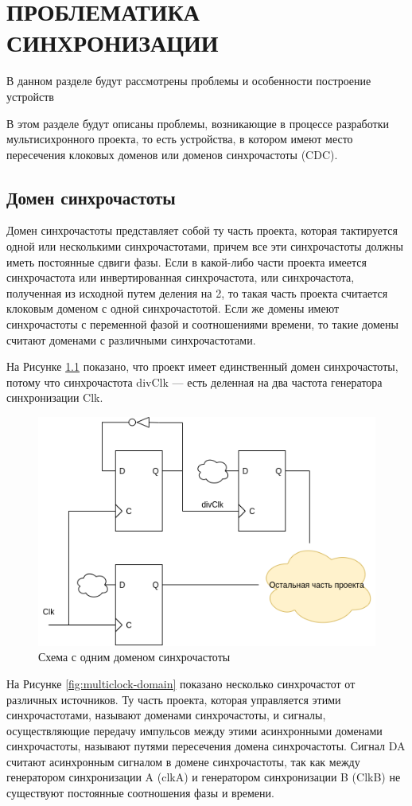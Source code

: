 \chapter{ПРОБЛЕМАТИКА СИНХРОНИЗАЦИИ}

В данном разделе будут рассмотрены проблемы и особенности построение устройств


В этом разделе будут описаны проблемы, возникающие в процессе разработки мультисихронного проекта, то есть устройства, в котором имеют место пересечения клоковых доменов или доменов синхрочастоты (CDC).

\section{Домен синхрочастоты}
Домен синхрочастоты представляет собой ту часть проекта, которая тактируется одной или несколькими синхрочастотами, причем все эти синхрочастоты должны иметь постоянные сдвиги фазы. Если в какой-либо части проекта имеется синхрочастота или инвертированная синхрочастота, или синхрочастота, полученная из исходной путем деления на 2, то такая часть проекта считается клоковым доменом с одной синхрочастотой. Если же домены имеют синхрочастоты с переменной фазой и соотношениями времени, то такие домены считают доменами с различными синхрочастотами. 

На Рисунке \ref{fig:clock-domain} показано, что проект имеет единственный домен синхрочастоты, потому что синхрочастота divClk --- есть деленная на два частота генератора синхронизации Clk.

\begin{figure}[h!]
	\centering
	\includegraphics[width=0.5\linewidth]{course-scheme/images/clock-domain}
	\caption{Схема с одним доменом синхрочастоты}
	\label{fig:clock-domain}
\end{figure}


На Рисунке \ref{fig:multiclock-domain} показано несколько синхрочастот от различных источников. Ту часть проекта, которая управляется этими синхрочастотами, называют доменами синхрочастоты, и сигналы, осуществляющие передачу импульсов между этими асинхронными доменами синхрочастоты, называют путями пересечения домена синхрочастоты. Сигнал DA считают асинхронным сигналом в домене синхрочастоты, так как между генератором синхронизации A (clkA) и генератором синхронизации B (ClkB) не существуют постоянные соотношения фазы и времени. 




